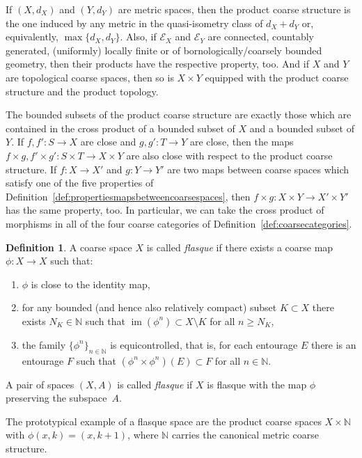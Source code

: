 \documentclass[pdftex]{sigma}
\numberwithin{equation}{section}
\theoremstyle{definition}
\newtheorem{defn}[thm]{Definition}
\newcommand{\N}{\mathbb{N}}
\newcommand{\coarseStr}{\mathcal{E}}
\DeclareMathOperator{\im}{im}
\begin{document}
If $(X,d_X)$ and $(Y,d_Y)$ are metric spaces, then the product coarse structure is the one induced by any metric in the quasi-isometry class of $d_X+d_Y$ or, equivalently, $\max\{d_X,d_Y\}$.
Also, if $\coarseStr_X$ and $\coarseStr_Y$ are connected, countably generated, (uniformly) locally finite or of bornologically/coarsely bounded geometry, then their products have the respective property, too. And if $X$ and $Y$ are topological coarse spaces, then so is $X\times Y$ equipped with the product coarse structure and the product topology.

The bounded subsets of the product coarse structure are exactly those which are contained in the cross product of a bounded subset of $X$ and a bounded subset of $Y$.
If $f,f'\colon S\to X$ are close and $g,g'\colon T\to Y$ are close, then the maps $f\times g, f'\times g'\colon S\times T\to X\times Y$ are also close with respect to the product coarse structure.
If $f\colon X\to X'$ and $g\colon Y\to Y'$ are two maps between coarse spaces which satisfy one of the five properties of Definition~\ref{def:propertiesmapsbetweencoarsespaces}, then $f\times g\colon X\times Y\to X'\times Y'$ has the same property, too.
In particular, we can take the cross product of morphisms in all of the four coarse categories of Definition~\ref{def:coarsecategories}.


\begin{defn}\label{def:flasqueness}
A coarse space $X$ is called \emph{flasque} if there exists a coarse map $\phi\colon X\to X$ such that:
\begin{enumerate}\itemsep=0pt
\item[$\bullet$] $\phi$ is close to the identity map,
\item[$\bullet$] for any bounded (and hence also relatively compact) subset $K\subset X$ there exists $N_K\in\N$ such that $\im(\phi^n)\subset X\setminus K$ for all $n\geq N_K$,
\item[$\bullet$] the family $\{\phi^n\}_{n\in\N}$ is equicontrolled, that is, for each entourage $E$ there is an entourage $F$ such that $(\phi^n\times\phi^n)(E)\subset F$ for all $n\in\N$.
\end{enumerate}
A pair of spaces $(X,A)$ is called \emph{flasque} if $X$ is flasque with the map $\phi$ preserving the subspace~$A$.
\end{defn}


The prototypical example of a flasque space are the product coarse spaces $X\times\N$ with $\phi(x,k)=(x,k+1)$, where $\N$ carries the canonical metric coarse structure.
\end{document}
